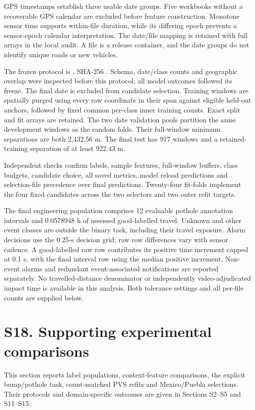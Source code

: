 GPS timestamps establish three usable date groups. Five workbooks without a recoverable GPS calendar are excluded before feature construction. Monotone sensor time supports within-file duration, while its differing epoch prevents a sensor-epoch calendar interpretation. The date/file mapping is retained with full arrays in the local audit. A file is a release container, and the date groups do not identify unique roads or new vehicles.

The frozen protocol is , SHA-256 . Schema, date/class counts and geographic overlap were inspected before this protocol; all model outcomes followed its freeze. The final date is excluded from candidate selection. Training windows are spatially purged using every raw coordinate in their span against eligible held-out anchors, followed by fixed common per-class inner training counts. Exact split and fit arrays are retained. The two date validation pools partition the same development windows as the random folds. Their full-window minimum separations are both 2,432.56 m. The final test has 917 windows and a retained-training separation of at least 922.43 m.

Independent checks confirm labels, sample features, full-window buffers, class budgets, candidate choice, all saved metrics, model reload predictions and selection-file precedence over final predictions. Twenty-four fit-folds implement the four fixed candidates across the two selectors and two outer refit targets.



The final engineering population comprises 12 evaluable pothole annotation intervals and 0.0578948 h of assessed good-labelled travel. Unknown and other event classes are outside the binary task, including their travel exposure. Alarm decisions use the 0.25-s decision grid; raw row differences vary with sensor cadence. A good-labelled raw row contributes its positive time increment capped at 0.1 s, with the final interval row using the median positive increment. Non-event alarms and redundant event-associated notifications are reported separately. No travelled-distance denominator or independently video-adjudicated impact time is available in this analysis. Both tolerance settings and all per-file counts are supplied below.


\clearpage
\section*{S18. Supporting experimental comparisons}
This section reports label populations, context-feature comparisons, the explicit bump/pothole task, count-matched PVS refits and Mexico/Puebla selections. Their protocols and domain-specific outcomes are given in Sections S2--S5 and S11--S15.







\clearpage
\begin{singlespace}\small

\end{singlespace}
